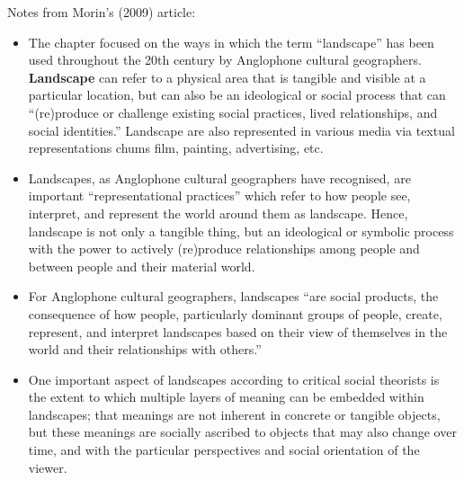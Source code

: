 \documentclass[a4paper, 10.5pt]{article} %
\begin{document}
\vspace{10pt}

Notes from Morin's (2009) article:

\begin{itemize}
  \item The chapter focused on the ways in which the term \enquote{landscape} has been used throughout the 20th century by Anglophone cultural geographers. \textbf{Landscape} can refer to a physical area that is tangible and visible at a particular location, but can also be an ideological or social process that can \enquote{(re)produce or challenge existing social practices, lived relationships, and social identities.} Landscape are also represented in various media via textual representations chums film, painting, advertising, etc.
  \item Landscapes, as Anglophone cultural geographers have recognised, are important \enquote{representational practices} which refer to how people see, interpret, and represent the world around them as landscape. Hence, landscape is not only a tangible thing, but an ideological or symbolic process with the power to actively (re)produce relationships among people and between people and their material world.
  \item For Anglophone cultural geographers, landscapes \enquote{are social products, the consequence of how people, particularly dominant groups of people, create, represent, and interpret landscapes based on their view of themselves in the world and their relationships with others.}
  \item One important aspect of landscapes according to critical social theorists is the extent to which multiple layers of meaning can be embedded within landscapes; that meanings are not inherent in concrete or tangible objects, but these meanings are socially ascribed to objects that may also change over time, and with the particular perspectives and social orientation of the viewer.
\end{itemize}





\end{document}
